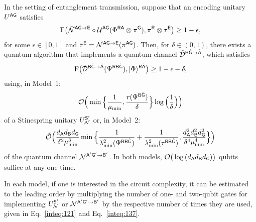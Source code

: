 \begin{theorem}
\label{thm:Uhlmann decoder ent trans}
    In the setting of entanglement transmission, suppose that an encoding unitary $U^{{\mathsf{A}}{\mathsf{G}}}$ satisfies
    \begin{align}
    \label{inteq:136}
        {\mathrm{F}}\big(\bar{{\mathcal{N}}}^{{\mathsf{A}}{\mathsf{G}}\rightarrow{\mathsf{E}}}\circ{\mathcal{U}}^{{\mathsf{A}}{\mathsf{G}}}(\Phi^{{\mathsf{R}}{\mathsf{A}}} \otimes \pi^{\mathsf{G}}), \pi^{\mathsf{R}} \otimes \tau^{\mathsf{E}}\big) \geq 1 - \epsilon,
    \end{align}
    for some $\epsilon \in [0, 1]$ and $\tau^{\mathsf{E}} = \bar{{\mathcal{N}}}^{{\mathsf{A}}{\mathsf{G}}\rightarrow{\mathsf{E}}}(\pi^{{\mathsf{A}}{\mathsf{G}}})$.
    Then, for $\delta \in (0, 1)$, there exists a quantum algorithm that implements a quantum channel $\tilde{{\mathcal{D}}}^{{\mathsf{B}}\hat{{\mathsf{G}}}\rightarrow\hat{{\mathsf{A}}}}$, which satisfies
    \begin{align}
    \label{inteq:157}
        {\mathrm{F}}\big(\tilde{{\mathcal{D}}}^{{\mathsf{B}}\hat{{\mathsf{G}}} \rightarrow \hat{{\mathsf{A}}}}(\Psi^{{\mathsf{R}}{\mathsf{B}}\hat{{\mathsf{G}}}}), |\Phi\rangle^{{\mathsf{R}}\hat{{\mathsf{A}}}}\big) \geq 1 - \epsilon -\delta,
    \end{align}
    using, in Model~1: 
    \begin{align}
    \label{inteq:121}
        {\mathcal{O}}\Big(\min\Big\{\frac{1}{\mu_{\rm min}}, \frac{r(\Psi^{{\mathsf{B}}\hat{{\mathsf{G}}}})}{\delta}\Big\}\log{\Big(\frac{1}{\delta}\Big)}\Big)
    \end{align}
    of a Stinespring unitary $U_{\mathcal{N}}^{{\mathsf{S}}'}$ or, 
    in Model~2: 
    \begin{align}
    \label{inteq:137}
        \tilde{{\mathcal{O}}}\Big(\frac{d_{\mathsf{A}} d_{\mathsf{B}} d_{\mathsf{G}}}{\delta^2 \mu_{\rm min}^3} \min\Big\{\frac{1}{\lambda_{\rm min}^2(\Psi^{{\mathsf{R}}{\mathsf{B}}\hat{{\mathsf{G}}}})} + \frac{1}{\lambda_{\rm min}^2(\tau^{{\mathsf{R}}{\mathsf{B}}\hat{{\mathsf{G}}}})}, \frac{d_{\mathsf{A}}^2 d_{\mathsf{B}}^2 d_{\mathsf{G}}^2}{\delta^4 \mu_{\rm min}^4}\Big\}\Big)
    \end{align}
    of the quantum channel ${\mathcal{N}}^{{\mathsf{A}}'{\mathsf{G}}'\rightarrow{\mathsf{B}}'}$.
    In both models, ${\mathcal{O}}\big(\log{(d_{\mathsf{A}}d_{\mathsf{B}}d_{\mathsf{G}})}\big)$ qubits suffice at any one time.
\end{theorem}



In each model, if one is interested in the circuit complexity, it can be estimated to the leading order by multiplying the number of one- and two-qubit gates for implementing $U_{\mathcal{N}}^{{\mathsf{S}}'}$ or ${\mathcal{N}}^{{\mathsf{A}}'{\mathsf{G}}'\rightarrow{\mathsf{B}}'}$ by the respective number of times they are used, given in Eq.~\eqref{inteq:121} and Eq.~\eqref{inteq:137}.




